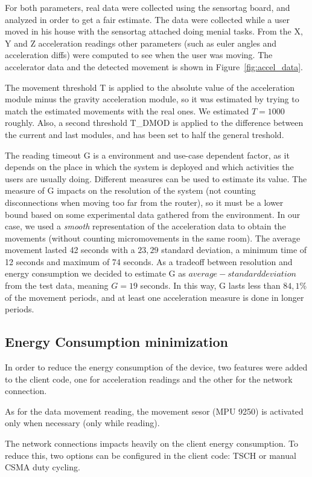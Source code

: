 \documentclass[a4paper, 10pt]{article}
\begin{document}
For both parameters, real data were collected using the sensortag board, and analyzed in order to get a fair estimate.
The data were collected while a user moved in his house with the sensortag attached doing menial tasks.
From the X, Y and Z acceleration readings other parameters (such as euler angles and acceleration diffs) were computed to see when the user was moving.
The accelerator data and the detected movement is shown in Figure~\ref{fig:accel_data}.

The movement threshold T is applied to the absolute value of the acceleration module minus the gravity acceleration module, so it was estimated by trying to match the estimated movements with the real ones. We estimated $T = 1000$ roughly. Also, a second threshold T\_DMOD is applied to the difference between the current and last modules, and has been set to half the general treshold. 

The reading timeout G is a environment and use-case dependent factor, as it depends on the place in which the system is deployed and which activities the users are usually doing.
Different measures can be used to estimate its value.
The measure of G impacts on the resolution of the system (not counting disconnections when moving too far from the router), so it must be a lower bound based on some experimental data gathered from the environment.
In our case, we used a \emph{smooth} representation of the acceleration data to obtain the movements (without counting micromovements in the same room).
The average movement lasted 42 seconds with a $23,29$ standard deviation, a minimum time of 12 seconds and maximum of 74 seconds.
As a tradeoff between resolution and energy consumption we decided to estimate G as $average - standard deviation$ from the test data, meaning $G = 19$ seconds.
In this way, G lasts less than $84,1$\% of the movement periods, and at least one acceleration measure is done in longer periods.

\subsection*{Energy Consumption minimization}
In order to reduce the energy consumption of the device, two features were added to the client code, one for acceleration readings and the other for the network connection.

As for the data movement reading, the movement sesor (MPU 9250) is activated only when necessary (only while reading). 

The network connections impacts heavily on the client energy consumption. To reduce this, two options can be configured in the client code: TSCH or manual CSMA duty cycling.
\end{document}
